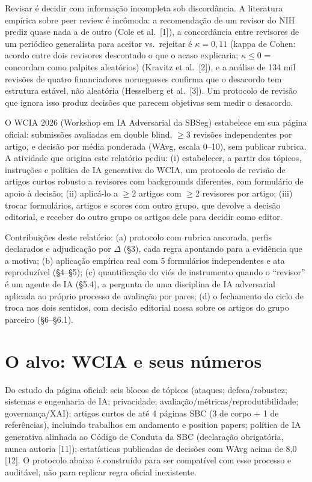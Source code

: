 \documentclass[10pt,a4paper,twocolumn]{article}
\begin{document}
Revisar é decidir com informação incompleta sob discordância. A literatura empírica sobre peer review é incômoda: a recomendação de um revisor do NIH prediz quase nada a de outro (Cole et al.\ [1]), a concordância entre revisores de um periódico generalista para aceitar vs.\ rejeitar é $\kappa = 0{,}11$ (kappa de Cohen: acordo entre dois revisores descontado o que o acaso explicaria; $\kappa \leq 0$ = concordam como palpites aleatórios) (Kravitz et al.\ [2]), e a análise de 134 mil revisões de quatro financiadores noruegueses confirma que o desacordo tem estrutura estável, não aleatória (Hesselberg et al.\ [3]). Um protocolo de revisão que ignora isso produz decisões que parecem objetivas sem medir o desacordo.

O WCIA 2026 (Workshop em IA Adversarial da SBSeg) estabelece em sua página oficial: submissões avaliadas em double blind, $\geq$3 revisões independentes por artigo, e decisão por média ponderada (WAvg, escala 0--10), sem publicar rubrica. A atividade que origina este relatório pediu: (i) estabelecer, a partir dos tópicos, instruções e política de IA generativa do WCIA, um protocolo de revisão de artigos curtos robusto a revisores com backgrounds diferentes, com formulário de apoio à decisão; (ii) aplicá-lo a $\geq$2 artigos com $\geq$2 revisores por artigo; (iii) trocar formulários, artigos e scores com outro grupo, que devolve a decisão editorial, e receber do outro grupo os artigos dele para decidir como editor.

Contribuições deste relatório: (a) protocolo com rubrica ancorada, perfis declarados e adjudicação por $\Delta$ (\S3), cada regra apontando para a evidência que a motiva; (b) aplicação empírica real com 5 formulários independentes e ata reproduzível (\S4--\S5); (c) quantificação do viés de instrumento quando o ``revisor'' é um agente de IA (\S5.4), a pergunta de uma disciplina de IA adversarial aplicada ao próprio processo de avaliação por pares; (d) o fechamento do ciclo de troca nos dois sentidos, com decisão editorial nossa sobre os artigos do grupo parceiro (\S6--\S6.1).

\section{O alvo: WCIA e seus números}

Do estudo da página oficial: seis blocos de tópicos (ataques; defesa/robustez; sistemas e engenharia de IA; privacidade; avaliação/métricas/reprodutibilidade; governança/XAI); artigos curtos de até 4 páginas SBC (3 de corpo + 1 de referências), incluindo trabalhos em andamento e position papers; política de IA generativa alinhada ao Código de Conduta da SBC (declaração obrigatória, nunca autoria [11]); estatísticas publicadas de decisões com WAvg acima de 8,0 [12]. O protocolo abaixo é construído para ser compatível com esse processo e auditável, não para replicar regra oficial inexistente.
\end{document}

